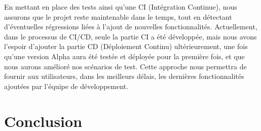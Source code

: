 \documentclass[12pt]{article}
\begin{document}
\justify
\text En mettant en place des tests ainsi qu'une CI (Intégration Continue), nous assurons que le projet reste maintenable dans le temps, tout en détectant d'éventuelles régressions liées à l'ajout de nouvelles fonctionnalités. Actuellement, dans le processus de CI/CD, seule la partie CI a été développée, mais nous avons l'espoir d'ajouter la partie CD (Déploiement Continu) ultérieurement, une fois qu'une version Alpha aura été testée et déployée pour la première fois, et que nous aurons amélioré nos scénarios de test. Cette approche nous permettra de fournir aux utilisateurs, dans les meilleurs délais, les dernières fonctionnalités ajoutées par l'équipe de développement.


\newpage
\section{Conclusion}
\end{document}
